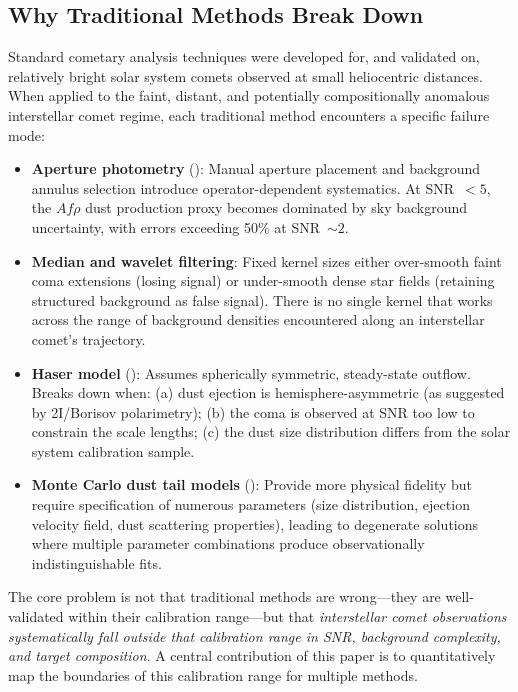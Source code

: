 \documentclass[preprint2]{aastex631}
\begin{document}
\subsection{Why Traditional Methods Break Down}

Standard cometary analysis techniques were developed for, and validated on, relatively bright solar system comets observed at small heliocentric distances. When applied to the faint, distant, and potentially compositionally anomalous interstellar comet regime, each traditional method encounters a specific failure mode:

\begin{itemize}
    \item \textbf{Aperture photometry} (\citealt{lamy04}): Manual aperture placement and background annulus selection introduce operator-dependent systematics. At SNR~$< 5$, the $Af\rho$ dust production proxy \citep{ahearn95} becomes dominated by sky background uncertainty, with errors exceeding 50\% at SNR~$\sim 2$.
    \item \textbf{Median and wavelet filtering}: Fixed kernel sizes either over-smooth faint coma extensions (losing signal) or under-smooth dense star fields (retaining structured background as false signal). There is no single kernel that works across the range of background densities encountered along an interstellar comet's trajectory.
    \item \textbf{Haser model} (\citealt{haser57}): Assumes spherically symmetric, steady-state outflow. Breaks down when: (a) dust ejection is hemisphere-asymmetric (as suggested by 2I/Borisov polarimetry); (b) the coma is observed at SNR too low to constrain the scale lengths; (c) the dust size distribution differs from the solar system calibration sample.
    \item \textbf{Monte Carlo dust tail models} (\citealt{fulle10}): Provide more physical fidelity but require specification of numerous parameters (size distribution, ejection velocity field, dust scattering properties), leading to degenerate solutions where multiple parameter combinations produce observationally indistinguishable fits.
\end{itemize}

The core problem is not that traditional methods are wrong---they are well-validated within their calibration range---but that \textit{interstellar comet observations systematically fall outside that calibration range in SNR, background complexity, and target composition}. A central contribution of this paper is to quantitatively map the boundaries of this calibration range for multiple methods.
\end{document}

